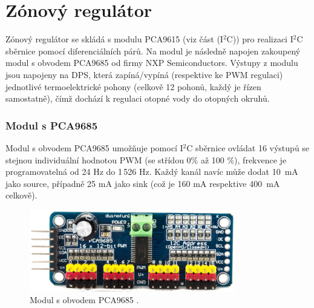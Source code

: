 \section{Zónový regulátor}
Zónový regulátor se skládá s modulu PCA9615 (viz část \label{ses:i2c-sbernice} (I$^2$C)) pro realizaci I$^2$C sběrnice pomocí diferenciálních párů. Na modul je následně napojen zakoupený modul s obvodem PCA9685 od firmy NXP Semiconductors. Výstupy z modulu jsou napojeny na DPS, která zapíná/vypíná (respektive ke PWM regulaci) jednotlivé termoelektrické pohony (celkově 12 pohonů, každý je řízen samostatně), čímž dochází k regulaci otopné vody do otopných okruhů.

\subsubsection{Modul s PCA9685}
Modul s obvodem PCA9685 umožňuje pomocí I$^2$C sběrnice ovládat 16 výstupů se stejnou individuální hodnotou PWM (se střídou 0\% až 100 \%), frekvence je programovatelná od 24 Hz do 1\,526 Hz. Každý kanál navíc může dodat 10~mA jako source, případně 25 mA jako sink (což je 160 mA respektive 400~mA celkově).

\begin{figure}[H]
    \centering
    \includegraphics[width=0.8\textwidth]{images/modul-pca9685-pwm-regulace.png}
    \caption[Modul s obvodem PCA9685.]{Modul s obvodem PCA9685 \cite{modul-pca9685}.}
    \label{fig:modul-pca9685-pwm-regulace}
\end{figure}
